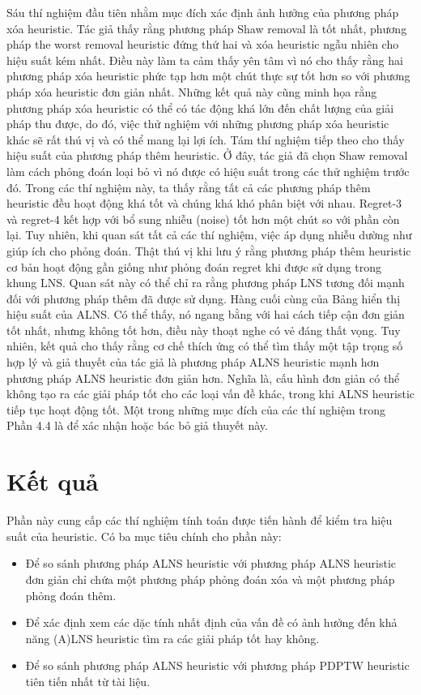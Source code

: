 Sáu thí nghiệm đầu tiên nhằm mục đích xác định ảnh hưởng của phương pháp xóa heuristic. Tác giả thấy rằng phương pháp Shaw removal là tốt nhất, phương pháp the worst removal heuristic đứng thứ hai và xóa heuristic ngẫu nhiên cho hiệu suất kém nhất. Điều này làm ta cảm thấy yên tâm vì nó cho thấy rằng hai phương pháp xóa heuristic phức tạp hơn một chút thực sự tốt hơn so với phương pháp xóa heuristic đơn giản nhất. Những kết quả này cũng minh họa rằng phương pháp xóa heuristic có thể có tác động khá lớn đến chất lượng của giải pháp thu được, do đó, việc thử nghiệm với những phương pháp xóa heuristic khác sẽ rất thú vị và có thể mang lại lợi ích.
Tám thí nghiệm tiếp theo cho thấy hiệu suất của phương pháp thêm heuristic. Ở đây, tác giả đã chọn Shaw removal làm cách phỏng đoán loại bỏ vì nó được có hiệu suất trong các thử nghiệm trước đó. Trong các thí nghiệm này, ta thấy rằng tất cả các phương pháp thêm heuristic đều hoạt động khá tốt và chúng khá khó phân biệt với nhau. Regret-3 và regret-4 kết hợp với bổ sung nhiễu (noise) tốt hơn một chút so với phần còn lại. Tuy nhiên, khi quan sát tất cả các thí nghiệm, việc áp dụng nhiễu dường như giúp ích cho phỏng đoán. Thật thú vị khi lưu ý rằng phương pháp thêm heuristic cơ bản hoạt động gần giống như phỏng đoán regret khi được sử dụng trong khung LNS. Quan sát này có thể chỉ ra rằng phương pháp LNS tương đối mạnh đối với phương pháp thêm đã được sử dụng.
Hàng cuối cùng của Bảng hiển thị hiệu suất của ALNS. Có thể thấy, nó ngang bằng với hai cách tiếp cận đơn giản tốt nhất, nhưng không tốt hơn, điều này thoạt nghe có vẻ đáng thất vọng. Tuy nhiên, kết quả cho thấy rằng cơ chế thích ứng có thể tìm thấy một tập trọng số hợp lý và giả thuyết của tác giả là phương pháp ALNS heuristic mạnh hơn phương pháp ALNS heuristic đơn giản hơn. Nghĩa là, cấu hình đơn giản có thể không tạo ra các giải pháp tốt cho các loại vấn đề khác, trong khi ALNS heuristic tiếp tục hoạt động tốt.
Một trong những mục đích của các thí nghiệm trong Phần 4.4 là để xác nhận hoặc bác bỏ giả thuyết này.

\section{Kết quả}
Phần này cung cấp các thí nghiệm tính toán được tiến hành để kiểm tra hiệu suất của heuristic. Có ba mục tiêu chính cho phần này:
\begin{itemize}
    \item Để so sánh phương pháp ALNS heuristic với phương pháp ALNS heuristic đơn giản chỉ chứa một phương pháp phỏng đoán xóa và một phương pháp phỏng đoán thêm.
    \item Để xác định xem các dặc tính nhất định của vấn đề có ảnh hưởng đến khả năng (A)LNS heuristic tìm ra các giải pháp tốt hay không.
    \item Để so sánh phương pháp ALNS heuristic với phương pháp PDPTW heuristic tiên tiến nhất từ tài liệu.
   
\end{itemize}

